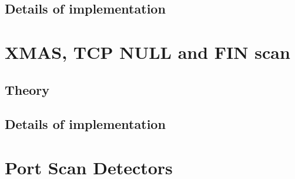 \documentclass[a4paper]{scrartcl}
\begin{document}
	
	
	\subsection{Details of implementation}

	
	\section{XMAS, TCP NULL and FIN scan}
		\subsection{Theory}
		
		\subsection{Details of implementation}
		
	\section{Port Scan Detectors}
	
	
	
	\newpage
	\printbibliography
\end{document}

